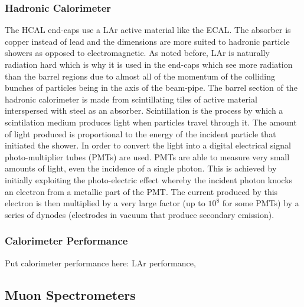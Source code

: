 \subsubsection{Hadronic Calorimeter} The HCAL end-caps use a LAr active material
like the ECAL. The absorber is copper instead of lead and the dimensions are
more suited to hadronic particle showers as opposed to electromagnetic. As noted
before, LAr is naturally radiation hard which is why it is used in the end-caps
which see more radiation than the barrel regions due to almost all of the
momentum of the colliding bunches of particles being in the axis of the
beam-pipe. The barrel section of the hadronic calorimeter is made from
scintillating tiles of active material interspersed with steel as an absorber.
Scintillation is the process by which a scintilation medium produces light when
particles travel through it. The amount of light produced is proportional to the
energy of the incident particle that initiated the shower. In order to convert
the light into a digital electrical signal photo-multiplier tubes (PMTs) are
used. PMTs are able to measure very small amounts of light, even the incidence
of a single photon. This is achieved by initially exploiting the photo-electric
effect whereby the incident photon knocks an electron from a metallic part of
the PMT. The current produced by this electron is then multiplied by a very
large factor (up to $10^8$ for some PMTs) by a series of dynodes (electrodes in
vacuum that produce secondary emission).

\subsubsection{Calorimeter Performance}
Put calorimeter performance here: LAr performance, 

\subsection{Muon Spectrometers}%
\label{sec:muon}

